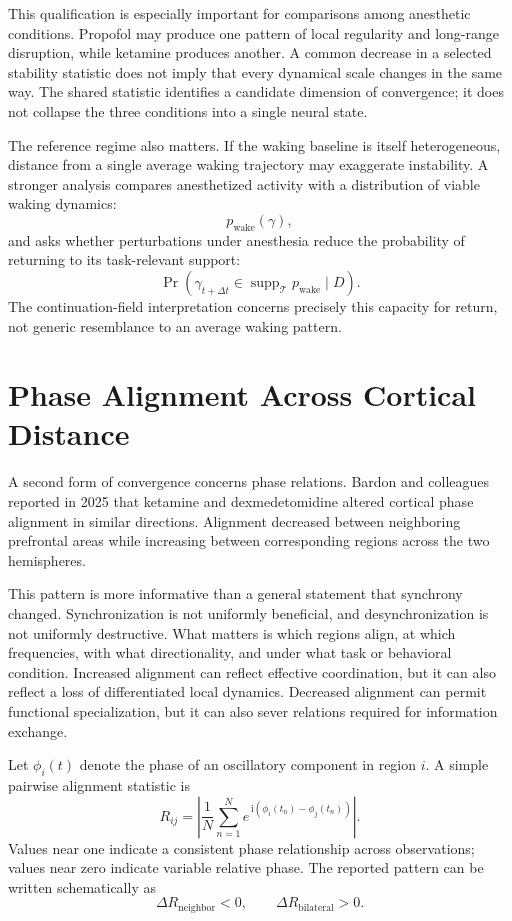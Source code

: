\documentclass[11pt]{book}
\begin{document}
This qualification is especially important for comparisons among anesthetic conditions. Propofol may produce one pattern of local regularity and long-range disruption, while ketamine produces another. A common decrease in a selected stability statistic does not imply that every dynamical scale changes in the same way. The shared statistic identifies a candidate dimension of convergence; it does not collapse the three conditions into a single neural state.

The reference regime also matters. If the waking baseline is itself heterogeneous, distance from a single average waking trajectory may exaggerate instability. A stronger analysis compares anesthetized activity with a distribution of viable waking dynamics:
\[
p_{\mathrm{wake}}(\gamma),
\]
and asks whether perturbations under anesthesia reduce the probability of returning to its task-relevant support:
\[
\Pr\!\left(
\gamma_{t+\Delta t}
\in
\operatorname{supp}_{\mathcal T}
p_{\mathrm{wake}}
\mid
D
\right).
\]
The continuation-field interpretation concerns precisely this capacity for return, not generic resemblance to an average waking pattern.

\section*{Phase Alignment Across Cortical Distance}

A second form of convergence concerns phase relations. Bardon and colleagues reported in 2025 \cite{bardon2025} that ketamine and dexmedetomidine altered cortical phase alignment in similar directions. Alignment decreased between neighboring prefrontal areas while increasing between corresponding regions across the two hemispheres.

This pattern is more informative than a general statement that synchrony changed. Synchronization is not uniformly beneficial, and desynchronization is not uniformly destructive. What matters is which regions align, at which frequencies, with what directionality, and under what task or behavioral condition. Increased alignment can reflect effective coordination, but it can also reflect a loss of differentiated local dynamics. Decreased alignment can permit functional specialization, but it can also sever relations required for information exchange.

Let $\phi_i(t)$ denote the phase of an oscillatory component in region $i$. A simple pairwise alignment statistic is
\[
R_{ij}
=
\left|
\frac{1}{N}
\sum_{n=1}^{N}
e^{\,\mathrm{i}
\left(
\phi_i(t_n)-\phi_j(t_n)
\right)}
\right|.
\]
Values near one indicate a consistent phase relationship across observations; values near zero indicate variable relative phase. The reported pattern can be written schematically as
\[
\Delta R_{\mathrm{neighbor}}<0,
\qquad
\Delta R_{\mathrm{bilateral}}>0.
\]
\end{document}
